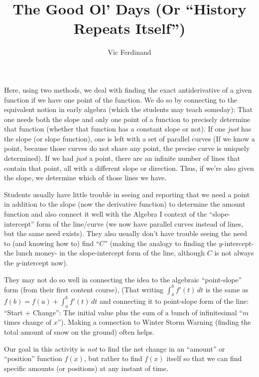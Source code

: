 \documentclass{ximera}
\author{Vic Ferdinand}
\title{The Good Ol' Days (Or ``History Repeats Itself'')}
\begin{document}
\begin{abstract}
\end{abstract}
\maketitle

\begin{instructorIntro}
Here, using two methods, we deal with finding the exact antiderivative of a given function if we have one point of the function.  We do so by connecting to the equivalent notion in early algebra (which the students may teach someday):  That one needs both the slope and only one point of a function to precisely determine that function (whether that function has a constant slope or not).  If one {\em just} has the slope (or slope function), one is left with a set of parallel curves (If we know a point, because those curves do not share any point, the precise curve is uniquely determined).  If we had {\em just} a point, there are an infinite number of lines that contain that point, all with a different slope or direction.  Thus, if we're also given the slope, we determine which of those lines we have.

Students usually have little trouble in seeing and reporting that we need a point in addition to the slope (now the derivative function) to determine the amount function and also connect it well with the Algebra I context of the ``slope-intercept'' form of the line/curve (we now have parallel curves instead of lines, but the same need exists).  They also usually don't have trouble seeing the need to (and knowing how to) find ``$C$'' (making the analogy to finding the $y$-intercept- the lunch money- in the slope-intercept form of the line, although $C$ is not always the $y$-intercept now).

They may not do so well in connecting the idea to the algebraic ``point-slope'' form (from their first content course), (That writing $\int_a^b f'(t)\, dt$ is the same as $f(b) = f(a) + \int_a^b f'(t)\, dt$ and connecting it to point-slope form of the line:  ``Start + Change'':  The initial value plus the sum of a bunch of infinitesimal ``$m$ times change of $x$'').  Making a connection to Winter Storm Warning (finding the total amount of snow on the ground) often helps.



\end{instructorIntro}

Our goal in this activity is {\em not} to find the net change in an ``amount'' or ``position'' function $f(x)$, but rather to find $f(x)$ itself so that we can find specific amounts (or positions) at any instant of time.  
     
\end{document}
